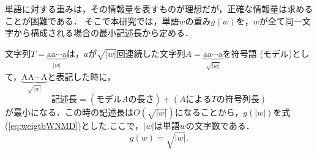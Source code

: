 単語に対する重みは，その情報量を表すものが理想だが，正確な情報量は求めることが困難である．
そこで本研究では，単語$w$の重み$g(w)$を，$w$が全て同一文字から構成される場合の最小記述長から定める．

文字列$T=\underbrace{\mbox{aa}\cdots \mbox{a}}_{|w|}$は，$a$が$\sqrt{|w|}$回連続した文字列$A=\underbrace{\mbox{aa}\cdots \mbox{a}}_{\sqrt{|w|}}$を符号語
(モデル)として，$\underbrace{\mbox{AA}\cdots \mbox{A}}_{\sqrt{|w|}}$と表記した時に，
$$記述長=(モデルAの長さ)+(AによるTの符号列長)$$
が最小になる．この時の記述長は$O(\sqrt{|w|})$になることから，$g(|w|)$を式(\ref{eq:weigtbWNMD})とした.ここで，$|w|$は単語$w$の文字数である．
\begin{equation}
\label{eq:weigtbWNMD}
g(w)=\sqrt{|w|}.
\end{equation}

